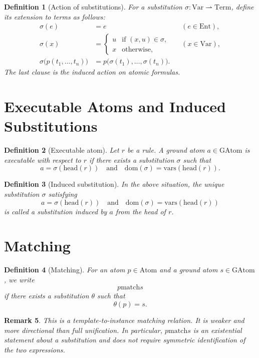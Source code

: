 \documentclass[11pt]{article}
\newtheorem{definition}{Definition}[section]
\newtheorem{remark}[definition]{Remark}
\newcommand{\Ent}{\mathrm{Ent}}
\newcommand{\Var}{\mathrm{Var}}
\newcommand{\Term}{\mathrm{Term}}
\newcommand{\Atom}{\mathrm{Atom}}
\newcommand{\GAtom}{\mathrm{GAtom}}
\newcommand{\headsym}{\mathrm{head}}
\newcommand{\dom}{\mathrm{dom}}
\newcommand{\vars}{\mathrm{vars}}
\newcommand{\matchrel}{\mathrel{\mathrm{match}}}
\begin{document}
\begin{definition}[Action of substitutions]
For a substitution $\sigma: \Var \rightharpoonup \Term$, define its extension to terms as follows:
\begin{align*}
\sigma(e) &= e && (e \in \Ent), \\
\sigma(x) &=
\begin{cases}
u & \text{if } (x,u) \in \sigma,\\
x & \text{otherwise},
\end{cases}
&& (x \in \Var), \\
\sigma\bigl(p(t_1,\dots,t_n)\bigr) &= p\bigl(\sigma(t_1),\dots,\sigma(t_n)\bigr).
\end{align*}
The last clause is the induced action on atomic formulas.
\end{definition}

\section{Executable Atoms and Induced Substitutions}

\begin{definition}[Executable atom]
Let $r$ be a rule. A ground atom $a \in \GAtom$ is \emph{executable with respect to $r$} if there exists a substitution $\sigma$ such that
\[
a = \sigma(\headsym(r))
\quad\text{and}\quad
\dom(\sigma)=\vars(\headsym(r)).
\]
\end{definition}

\begin{definition}[Induced substitution]
In the above situation, the unique substitution $\sigma$ satisfying
\[
a = \sigma(\headsym(r))
\quad\text{and}\quad
\dom(\sigma)=\vars(\headsym(r))
\]
is called a substitution induced by $a$ from the head of $r$.
\end{definition}

\section{Matching}

\begin{definition}[Matching]
For an atom $p \in \Atom$ and a ground atom $s \in \GAtom$, we write
\[
p \matchrel s
\]
if there exists a substitution $\theta$ such that
\[
\theta(p)=s.
\]
\end{definition}

\begin{remark}
This is a template-to-instance matching relation. It is weaker and more directional than full unification.
In particular, $p \matchrel s$ is an existential statement about a substitution and does not require symmetric identification of the two expressions.
\end{remark}
\end{document}

